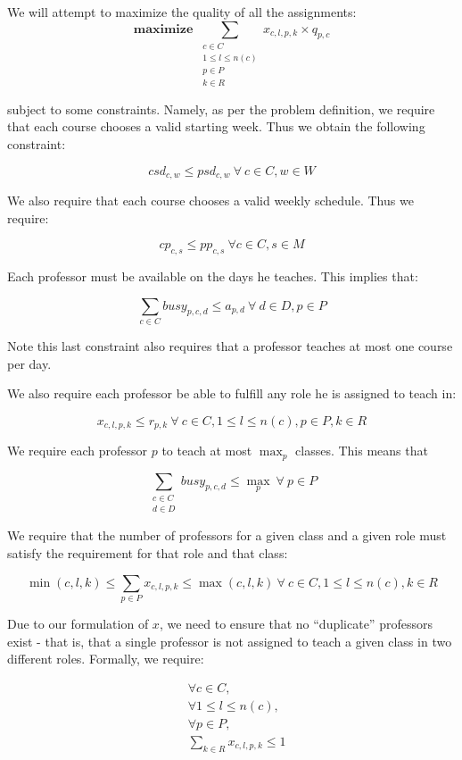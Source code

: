 We will attempt to maximize the quality of all the assignments:
$$
\textbf{maximize } \sum_{\substack{c \in C\\1 \le l \le n(c)\\p \in P\\k \in R}} x_{c, l, p, k} \times q_{p, c}
$$

subject to some constraints. Namely, as per the problem definition, we require that each course chooses a valid starting week. Thus we obtain the following constraint:

$$
csd_{c, w} \le psd_{c, w}\ \forall\ c \in C, w \in W
$$

We also require that each course chooses a valid weekly schedule. Thus we require:

$$
cp_{c, s} \le pp_{c, s}\ \forall c \in C, s \in M
$$

Each professor must be available on the days he teaches. This implies that:

$$
\sum_{c \in C} busy_{p, c, d} \le a_{p, d}\ \forall\ d \in D, p \in P
$$

Note this last constraint also requires that a professor teaches at most one course per day.

We also require each professor be able to fulfill any role he is assigned to teach in:

$$
x_{c, l, p, k} \le r_{p, k}\ \forall\ c \in C, 1 \le l \le n(c), p \in P, k \in R
$$

We require each professor $p$ to teach at most $\max_p$ classes. This means that

$$
\sum_{\substack{c \in C\\d \in D}} busy_{p, c, d} \le \textstyle{\max_p}\ \forall\ p \in P
$$

We require that the number of professors for a given class and a given role must satisfy the requirement for that role and that class:

$$
\min(c, l, k) \le \sum_{p \in P} x_{c, l, p, k} \le \max(c, l, k)\ \forall\ c \in C, 1 \le l \le n(c), k \in R
$$

Due to our formulation of $x$, we need to ensure that no ``duplicate'' professors exist - that is, that a single professor is not assigned to teach a given class in two different roles. Formally, we require:

\begin{align*}
  &\forall c \in C,\\
  &\forall 1 \le l \le n(c),\\
  &\forall p \in P,\\
  &\sum_{k \in R} x_{c, l, p, k} \le 1
\end{align*}


